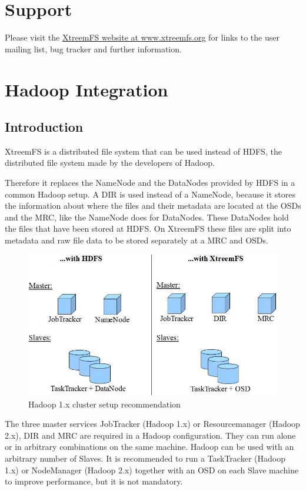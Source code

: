 \documentclass[a4paper,10pt]{book}
\begin{document}
\appendix

\chapter{Support}
Please visit the \href{http://www.xtreemfs.org}{XtreemFS website at www.xtreemfs.org} for links to the user mailing list, bug tracker and further information.


\chapter{Hadoop Integration}

\section{Introduction}
\label{sec:hadoop_integration}

XtreemFS is a distributed file system that can be used instead of HDFS, the distributed file system made by the developers of Hadoop.

Therefore it replaces the NameNode and the DataNodes provided by HDFS in a common Hadoop setup. A DIR is used instead of a NameNode, because it stores the information about where the files and their metadata are located at the OSDs and the MRC, like the NameNode does for DataNodes. These DataNodes hold the files that have been stored at HDFS. On XtreemFS these files are split into metadata and raw file data to be stored separately at a MRC and OSDs.

\begin{figure}[h]
 \centering
 \includegraphics[width=0.80\linewidth]{images/cluster_setup.png}
 \caption{Hadoop 1.x cluster setup recommendation}
 \label{fig:cluster_setup}
\end{figure}

The three master services JobTracker (Hadoop 1.x) or Resourcemanager (Hadoop 2.x), DIR and MRC are required in a Hadoop configuration. They can run alone or in arbitrary combinations on the same machine. Hadoop can be used with an arbitrary number of Slaves. It is recommended to run a TaskTracker (Hadoop 1.x) or NodeManager (Hadoop 2.x) together with an OSD on each Slave machine to improve performance, but it is not mandatory.
\end{document}
